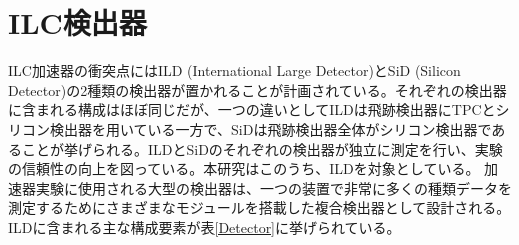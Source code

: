 \section{ILC検出器}
ILC加速器の衝突点にはILD (International Large Detector)とSiD (Silicon Detector)の2種類の検出器が置かれることが計画されている。それぞれの検出器に含まれる構成はほぼ同じだが、一つの違いとしてILDは飛跡検出器にTPCとシリコン検出器を用いている一方で、SiDは飛跡検出器全体がシリコン検出器であることが挙げられる。ILDとSiDのそれぞれの検出器が独立に測定を行い、実験の信頼性の向上を図っている。本研究はこのうち、ILDを対象としている。
加速器実験に使用される大型の検出器は、一つの装置で非常に多くの種類データを測定するためにさまざまなモジュールを搭載した複合検出器として設計される。ILDに含まれる主な構成要素が表\ref{Detector}に挙げられている。

